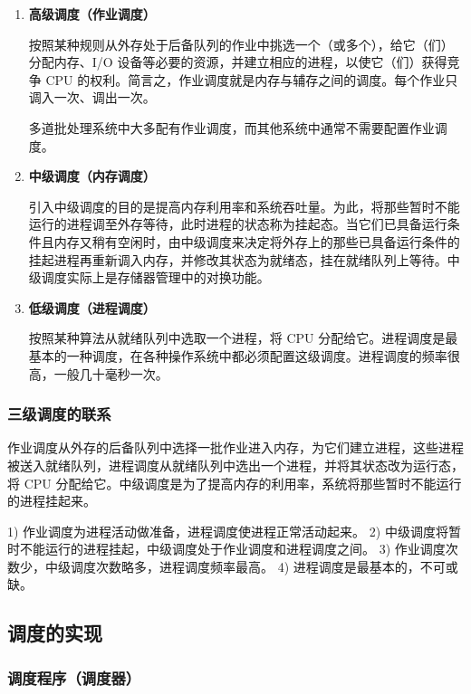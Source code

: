 \documentclass{ctexbook}
\begin{document}
	\begin{enumerate}
		\item \textbf{高级调度（作业调度）}
		
		按照某种规则从外存处于后备队列的作业中挑选一个（或多个），给它（们）分配内存、I/O 设备等必要的资源，并建立相应的进程，以使它（们）获得竞争 CPU 的权利。简言之，作业调度就是内存与辅存之间的调度。每个作业只调入一次、调出一次。
		
		多道批处理系统中大多配有作业调度，而其他系统中通常不需要配置作业调度。
		
		\item \textbf{中级调度（内存调度）}
		
		引入中级调度的目的是提高内存利用率和系统吞吐量。为此，将那些暂时不能运行的进程调至外存等待，此时进程的状态称为挂起态。当它们已具备运行条件且内存又稍有空闲时，由中级调度来决定将外存上的那些已具备运行条件的挂起进程再重新调入内存，并修改其状态为就绪态，挂在就绪队列上等待。中级调度实际上是存储器管理中的对换功能。
		
		\item \textbf{低级调度（进程调度）}
		
		按照某种算法从就绪队列中选取一个进程，将 CPU 分配给它。进程调度是最基本的一种调度，在各种操作系统中都必须配置这级调度。进程调度的频率很高，一般几十毫秒一次。
	\end{enumerate}
	
	\subsubsection{三级调度的联系}
	
	作业调度从外存的后备队列中选择一批作业进入内存，为它们建立进程，这些进程被送入就绪队列，进程调度从就绪队列中选出一个进程，并将其状态改为运行态，将 CPU 分配给它。中级调度是为了提高内存的利用率，系统将那些暂时不能运行的进程挂起来。
	
	1) 作业调度为进程活动做准备，进程调度使进程正常活动起来。
	2) 中级调度将暂时不能运行的进程挂起，中级调度处于作业调度和进程调度之间。
	3) 作业调度次数少，中级调度次数略多，进程调度频率最高。
	4) 进程调度是最基本的，不可或缺。
	
	\subsection{调度的实现}
	
	\subsubsection{调度程序（调度器）}
	
\end{document}
